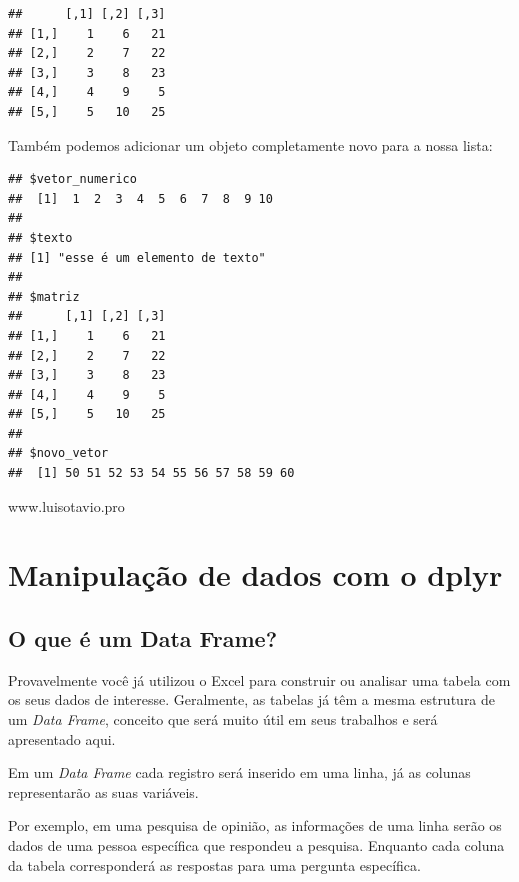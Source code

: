 \documentclass[
]{book}
\newenvironment{Shaded}{\begin{snugshade}}{\end{snugshade}}
\newcommand{\DecValTok}[1]{\textcolor[rgb]{0.00,0.00,0.81}{#1}}
\newcommand{\KeywordTok}[1]{\textcolor[rgb]{0.13,0.29,0.53}{\textbf{#1}}}
\newcommand{\NormalTok}[1]{#1}
\newcommand{\OperatorTok}[1]{\textcolor[rgb]{0.81,0.36,0.00}{\textbf{#1}}}
\begin{document}
\begin{verbatim}
##      [,1] [,2] [,3]
## [1,]    1    6   21
## [2,]    2    7   22
## [3,]    3    8   23
## [4,]    4    9    5
## [5,]    5   10   25
\end{verbatim}

Também podemos adicionar um objeto completamente novo para a nossa
lista:

\begin{Shaded}
\end{Shaded}

\begin{verbatim}
## $vetor_numerico
##  [1]  1  2  3  4  5  6  7  8  9 10
## 
## $texto
## [1] "esse é um elemento de texto"
## 
## $matriz
##      [,1] [,2] [,3]
## [1,]    1    6   21
## [2,]    2    7   22
## [3,]    3    8   23
## [4,]    4    9    5
## [5,]    5   10   25
## 
## $novo_vetor
##  [1] 50 51 52 53 54 55 56 57 58 59 60
\end{verbatim}

www.luisotavio.pro

\hypertarget{manipulauxe7uxe3o-de-dados-com-o-dplyr}{%
\chapter{Manipulação de dados com o
dplyr}\label{manipulauxe7uxe3o-de-dados-com-o-dplyr}}

\hypertarget{o-que-uxe9-um-data-frame}{%
\section{O que é um Data Frame?}\label{o-que-uxe9-um-data-frame}}

Provavelmente você já utilizou o Excel para construir ou analisar uma
tabela com os seus dados de interesse. Geralmente, as tabelas já têm a
mesma estrutura de um \emph{Data Frame}, conceito que será muito útil em
seus trabalhos e será apresentado aqui.

Em um \emph{Data Frame} cada registro será inserido em uma linha, já as
colunas representarão as suas variáveis.

Por exemplo, em uma pesquisa de opinião, as informações de uma linha
serão os dados de uma pessoa específica que respondeu a pesquisa.
Enquanto cada coluna da tabela corresponderá as respostas para uma
pergunta específica.
\end{document}
